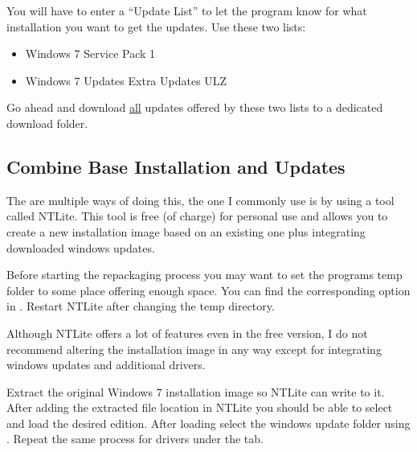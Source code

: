\documentclass{itsarticle}
\begin{document}

You will have to enter a ``Update List'' to let the program know for what
installation you want to get the updates. Use these two lists:

\begin{itemize}
    \item Windows 7 Service Pack 1\footnotemark
    \item Windows 7 Updates Extra Updates ULZ\footnotemark
\end{itemize}


Go ahead and download \underline{all} updates offered by these two lists to a
dedicated download folder.

\subsection{Combine Base Installation and Updates}
\label{sub:ntlite}

The are multiple ways of doing this, the one I commonly use is by using a tool
called NTLite\footnotemark. This tool is free (of charge) for personal use and
allows you to create a new installation image based on an existing one plus
integrating downloaded windows updates.


Before starting the repackaging process you may want to set the programs temp
folder to some place offering enough space. You can find the corresponding
option in . Restart NTLite
after changing the temp directory.

Although NTLite offers a lot of features even in the free version, I do not
recommend altering the installation image in any way except for integrating
windows updates and additional drivers.

Extract the original Windows 7 installation image so NTLite can write to it.
After adding the extracted file location in NTLite you should be able to select
and load the desired edition. After loading select the windows update folder
using . Repeat the same process for drivers under the  tab.
\end{document}
